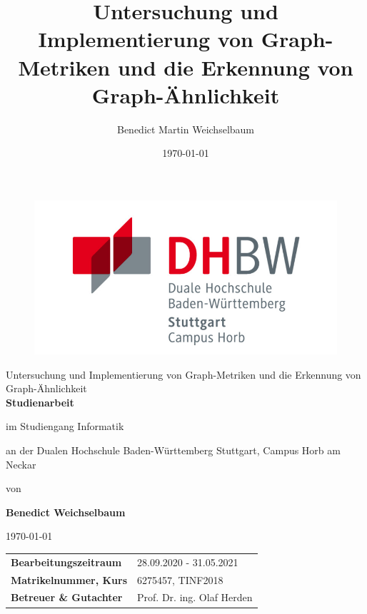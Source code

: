 \documentclass[a4paper,12pt,ngerman,chapterprefix=false,listof=totoc,bibliography=totoc]{scrreprt}
\begin{document}
\title{\Large{Untersuchung und Implementierung von Graph-Metriken und die Erkennung von Graph-Ähnlichkeit
}}
\author{Benedict Martin Weichselbaum}
\date{\today}
\begin{titlepage}
	\centering\hspace{8mm}
	\begin{figure}
		\centering
			\includegraphics[scale=1.3]{./Abbildungen/dhbwlogo.png}
	\end{figure}
	
	\vspace{5mm}	
	{\fontsize{26}{40}\selectfont
	Untersuchung und Implementierung von Graph-Metriken und die Erkennung von Graph-Ähnlichkeit
	}
	\\
	\vspace{2cm}
	\textbf{\Large{Studienarbeit}} \par
	\vspace{1cm}
	im Studiengang Informatik \par
	\vspace{0.3cm}
	an der Dualen Hochschule Baden-Württemberg Stuttgart, Campus Horb am Neckar \par
	\vspace{1.2cm}
	von \par
	\vspace{0.5cm}
	\textbf{\large{Benedict Weichselbaum}} \par
	\vspace{1.5cm}
	{\today}\par
	\vfill
	\begin{table}[ht]
		\hspace{1,5cm}
		\begin{tabular}{p{7cm}p{7cm}}
			\textbf{Bearbeitungszeitraum} & 28.09.2020 - 31.05.2021\\
			\textbf{Matrikelnummer, Kurs} & 6275457, TINF2018\\
			\textbf{Betreuer \& Gutachter} & Prof. Dr. ing. Olaf Herden\\
		\end{tabular}
	\end{table}
\end{titlepage}
\end{document}
